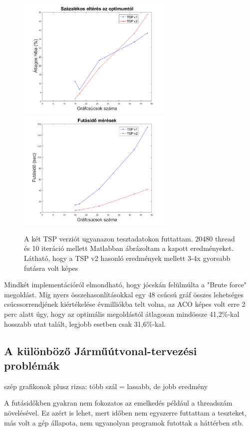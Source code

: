 \begin{figure}[ht!]
	\includegraphics[width=75mm, keepaspectratio]{figures/TSP-benchmark-error.png}
	\includegraphics[width=75mm, keepaspectratio]{figures/TSP-benchmark-time.png}
	\caption{A két TSP verziót ugyanazon tesztadatokon futtattam. 20480 thread és 10 iteráció mellett Matlabban ábrázoltam a kapott eredményeket. Látható, hogy a TSP v2 hasonló eredmények mellett 3-4x gyorsabb futásra volt képes}
	\label{fig:TSP-benchmark}
\end{figure}

Mindkét implementációról elmondható, hogy jócskán felülmúlta a "Brute force" megoldást. Míg nyers összehasonlításokkal egy 48 csúcsú gráf összes lehetséges csúcssorrendjének kiértékelése évmilliókba telt volna, az ACO képes volt erre 2 perc alatt úgy, hogy az optimális megoldástól átlagosan mindössze 41,2\%-kal hosszabb utat talált, legjobb esetben csak 31,6\%-kal.
  

\subsection{A különböző Járműútvonal-tervezési problémák}
szép grafikonok plusz rizsa: több szál = lassabb, de jobb eredmény

A futásidőkben gyakran nem fokozatos az emelkedés például a threadszám növelésével. Ez azért is lehet, mert időben nem egyszerre futtattam a teszteket, más volt a gép állapota, nem ugyanolyan programok futottak a háttérben stb.

